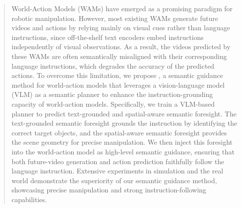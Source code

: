 \begin{abstract}
World-Action Models (WAMs) have emerged as a promising paradigm for robotic manipulation.
However, most existing WAMs generate future videos and actions by relying mainly on visual cues rather than language instructions, since off-the-shelf text encoders embed instructions independently of visual observations.
As a result, the videos predicted by these WAMs are often semantically misaligned with their corresponding language instructions, which degrades the accuracy of the predicted actions.
To overcome this limitation, we propose \ourmethod, a semantic guidance method for world-action models that leverages a vision-language model (VLM) as a semantic planner to enhance the instruction-grounding capacity of world-action models.
Specifically, we train a VLM-based planner to predict text-grounded and spatial-aware semantic foresight. 
The text-grounded semantic foresight grounds the instruction by identifying the correct target objects, and the spatial-aware semantic foresight provides the scene geometry for precise manipulation.
We then inject this foresight into the world-action model as high-level semantic guidance, ensuring that both future-video generation and action prediction faithfully follow the language instruction.
Extensive experiments in simulation and the real world demonstrate the superiority of our semantic guidance method, showcasing precise manipulation and strong instruction-following capabilities.
\end{abstract}
